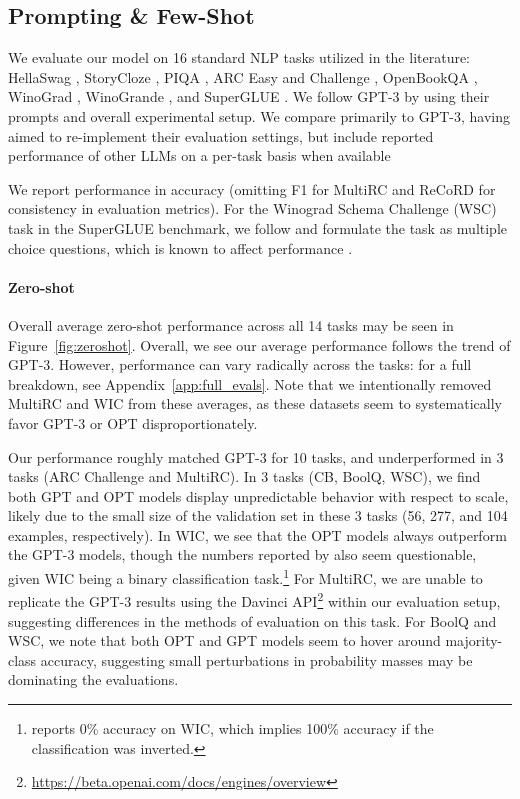 \documentclass[11pt]{article}
\newcommand{\davinci}[0]{{Davinci}}
\begin{document}
\subsection{Prompting \& Few-Shot}
\label{sec:prompt_and_fewshot}

We evaluate our model on 16 standard NLP tasks utilized in the literature: HellaSwag \cite{hellaswag}, StoryCloze \cite{storycloze}, PIQA \cite{bisk2020piqa}, ARC Easy and Challenge \cite{arc_challenge}, OpenBookQA \cite{openbookqa}, WinoGrad \cite{levesque2011winograd}, WinoGrande \cite{winogrande}, and SuperGLUE \cite{wang2019superglue}. We follow GPT-3 \cite{brown2020gpt3} by using their prompts and overall experimental setup. We compare primarily to GPT-3, having aimed to re-implement their  evaluation settings, but include reported performance of other LLMs on a per-task basis when available \cite{J1WhitePaper,gopher2022,chinchilla2022,eleutherai2022}

We report performance in accuracy (omitting F1 for MultiRC and ReCoRD for consistency in evaluation metrics). For the Winograd Schema Challenge (WSC) task in the SuperGLUE benchmark, we follow \cite{brown2020gpt3} and formulate the task as multiple choice questions, which is known to affect performance \cite{liu2020precise}.

\paragraph{Zero-shot} Overall average zero-shot performance across all 14 tasks may be seen in Figure~\ref{fig:zeroshot}. Overall, we see our average performance follows the trend of GPT-3. However, performance can vary radically across the tasks: for a full breakdown, see Appendix~\ref{app:full_evals}.  Note that we intentionally removed MultiRC and WIC from these averages, as these datasets seem to systematically favor GPT-3 or OPT disproportionately.

Our performance roughly matched GPT-3 for 10 tasks, and underperformed in 3 tasks (ARC Challenge and MultiRC). In 3 tasks (CB, BoolQ, WSC), we find both GPT and OPT models display unpredictable behavior with respect to scale, likely due to the small size of the validation set in these 3 tasks (56, 277, and 104 examples, respectively). In WIC, we see that the OPT models always outperform the GPT-3 models, though the numbers reported by \citet{brown2020gpt3} also seem questionable, given WIC being a binary classification task.\footnote{\citet{brown2020gpt3} reports 0\% accuracy on WIC, which implies 100\% accuracy if the classification was inverted.} For MultiRC, we are unable to replicate the GPT-3 results using the \davinci{} API\footnote{\url{https://beta.openai.com/docs/engines/overview}} within our evaluation setup, suggesting differences in the methods of evaluation on this task. For BoolQ and WSC, we note that both OPT and GPT models seem to hover around majority-class accuracy, suggesting small perturbations in probability masses may be dominating the evaluations.
\end{document}
